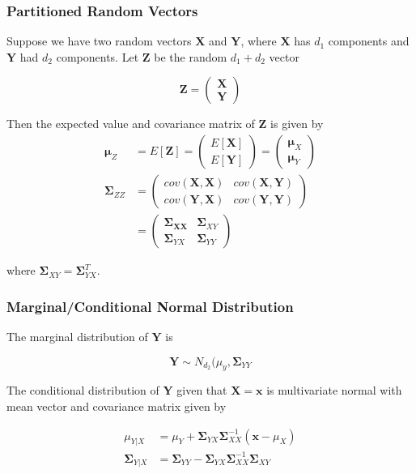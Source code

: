 \documentclass{beamer}
\begin{document}
\begin{frame}
\frametitle{Partitioned Random Vectors}
Suppose we have two random vectors $\mathbf{X}$ and $\mathbf{Y}$, where $\mathbf{X}$ has $d_1$ components and $\mathbf{Y}$ had $d_2$ components.  Let $\mathbf{Z}$ be the random $d_1 + d_2$ vector

$$\mathbf{Z} = \begin{pmatrix} \mathbf{X} \\ \mathbf{Y} \end{pmatrix}$$

Then the expected value and covariance matrix of $\mathbf{Z}$ is given by 
\begin{align*}
\mathbf{\mu}_Z &= E[\mathbf{Z}] = \begin{pmatrix} E[\mathbf{X}] \\ E[\mathbf{Y}] \end{pmatrix} = \begin{pmatrix} \mathbf{\mu}_X \\ \mathbf{\mu}_Y \end{pmatrix}\\
\mathbf{\Sigma}_{ZZ} &= \begin{pmatrix} cov(\mathbf{X}, \mathbf{X}) & cov(\mathbf{X}, \mathbf{Y}) \\ cov(\mathbf{Y}, \mathbf{X}) & cov(\mathbf{Y}, \mathbf{Y})  \end{pmatrix}\\
&= \begin{pmatrix}
\mathbf{\Sigma_{XX}} & \mathbf{\Sigma}_{XY}\\
\mathbf{\Sigma}_{YX} & \mathbf{\Sigma}_{YY}
\end{pmatrix}
\end{align*}

where $\mathbf{\Sigma}_{XY} = \mathbf{\Sigma}_{YX}^T$. 
\end{frame}

\begin{frame}
\frametitle{Marginal/Conditional Normal Distribution}
The marginal distribution of $\mathbf{Y}$ is

$$\mathbf{Y} \sim N_{d_2}(\mu_y, \mathbf{\Sigma}_{YY}$$

The conditional distribution of $\mathbf{Y}$ given that $\mathbf{X} = \mathbf{x}$ is multivariate normal with mean vector and covariance matrix given by

\begin{align*}
\mu_{Y|X} &= \mu_Y + \mathbf{\Sigma}_{YX} \mathbf{\Sigma}_{XX}^{-1} (\mathbf{x} - \mu_X)\\
\mathbf{\Sigma}_{Y|X} &= \mathbf{\Sigma}_{YY} - \mathbf{\Sigma}_{YX}\mathbf{\Sigma}_{XX}^{-1}\mathbf{\Sigma}_{XY}
\end{align*}

\end{frame}
\end{document}
